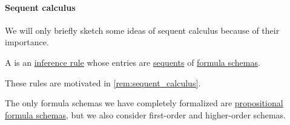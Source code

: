 \paragraph{Sequent calculus}

We will only briefly sketch some ideas of sequent calculus because of their importance.

\begin{definition}\label{def:sequent_calculus_rule}
  A  is an \hyperref[def:inference_rule]{inference rule} whose entries are \hyperref[def:sequent]{sequents} of \hyperref[con:schemas_and_instances]{formula schemas}.
\end{definition}
\begin{comments}
  \item These rules are motivated in \cref{rem:sequent_calculus}.
  \item The only formula schemas we have completely formalized are \hyperref[def:propositional_formula_schema]{propositional formula schemas}, but we also consider first-order and higher-order schemas.
\end{comments}

